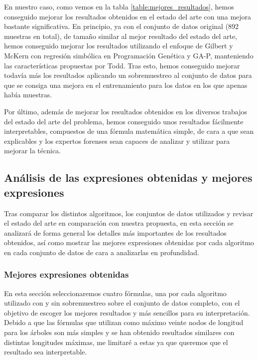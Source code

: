 En nuestro caso, como vemos en la tabla \ref{table:mejores_resultados}, hemos conseguido mejorar los resultados obtenidos en el estado del arte con una mejora bastante significativa. En principio, ya con el conjunto de datos original (892 muestras en total), de tamaño similar al mejor resultado del estado del arte, hemos conseguido mejorar los resultados utilizando el enfoque de Gilbert y McKern con regresión simbólica en Programación Genética y GA-P, manteniendo las características propuestas por Todd. Tras esto, hemos conseguido mejorar todavía más los resultados aplicando un sobremuestreo al conjunto de datos para que se consiga una mejora en el entrenamiento para los datos en los que apenas había muestras.

Por último, además de mejorar los resultados obtenidos en los diversos trabajos del estado del arte del problema, hemos conseguido unos resultados fácilmente interpretables, compuestos de una fórmula matemática simple, de cara a que sean explicables y los expertos forenses sean capaces de analizar y utilizar para mejorar la técnica.

\subsection{Análisis de las expresiones obtenidas y mejores expresiones}


Tras comparar los distintos algoritmos, los conjuntos de datos utilizados y revisar el estado del arte en comparación con nuestra propuesta, en esta sección se analizará de forma general los detalles más importantes de los resultados obtenidos, así como mostrar las mejores expresiones obtenidas por cada algoritmo en cada conjunto de datos de cara a analizarlas en profundidad.

\subsubsection{Mejores expresiones obtenidas}

En esta sección seleccionaremos cuatro fórmulas, una por cada algoritmo utilizado con y sin sobremuestreo sobre el conjunto de datos completo, con el objetivo de escoger los mejores resultados y más sencillos para su interpretación. Debido a que las fórmulas que utilizan como máximo veinte nodos de longitud para los árboles son más simples y se han obtenido resultados similares con distintas longitudes máximas, me limitaré a estas ya que queremos que el resultado sea interpretable.

